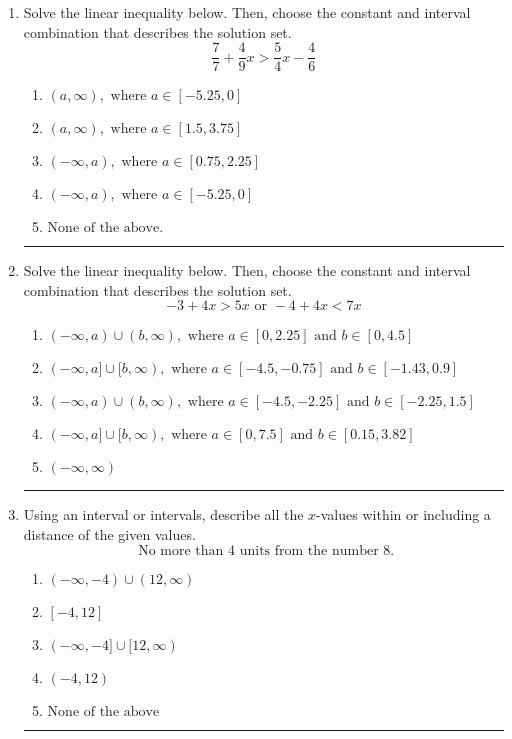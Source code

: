 \documentclass[14pt]{extbook}
\newcommand{\litem}[1]{\item#1\hspace*{-1cm}\rule{\textwidth}{0.4pt}}
\begin{document}
\begin{enumerate}
{\begin{enumerate}[label=\Alph*.]
\end{enumerate} }
\litem{
Solve the linear inequality below. Then, choose the constant and interval combination that describes the solution set.\[ \frac{7}{7} + \frac{4}{9} x > \frac{5}{4} x - \frac{4}{6} \]\begin{enumerate}[label=\Alph*.]
\item \( (a, \infty), \text{ where } a \in [-5.25, 0] \)
\item \( (a, \infty), \text{ where } a \in [1.5, 3.75] \)
\item \( (-\infty, a), \text{ where } a \in [0.75, 2.25] \)
\item \( (-\infty, a), \text{ where } a \in [-5.25, 0] \)
\item \( \text{None of the above}. \)

\end{enumerate} }
\litem{
Solve the linear inequality below. Then, choose the constant and interval combination that describes the solution set.\[ -3 + 4 x > 5 x \text{ or } -4 + 4 x < 7 x \]\begin{enumerate}[label=\Alph*.]
\item \( (-\infty, a) \cup (b, \infty), \text{ where } a \in [0, 2.25] \text{ and } b \in [0, 4.5] \)
\item \( (-\infty, a] \cup [b, \infty), \text{ where } a \in [-4.5, -0.75] \text{ and } b \in [-1.43, 0.9] \)
\item \( (-\infty, a) \cup (b, \infty), \text{ where } a \in [-4.5, -2.25] \text{ and } b \in [-2.25, 1.5] \)
\item \( (-\infty, a] \cup [b, \infty), \text{ where } a \in [0, 7.5] \text{ and } b \in [0.15, 3.82] \)
\item \( (-\infty, \infty) \)

\end{enumerate} }
\litem{
Using an interval or intervals, describe all the $x$-values within or including a distance of the given values.\[ \text{ No more than } 4 \text{ units from the number } 8. \]\begin{enumerate}[label=\Alph*.]
\item \( (-\infty, -4) \cup (12, \infty) \)
\item \( [-4, 12] \)
\item \( (-\infty, -4] \cup [12, \infty) \)
\item \( (-4, 12) \)
\item \( \text{None of the above} \)


\end{enumerate}}
\end{enumerate}
\end{document}
